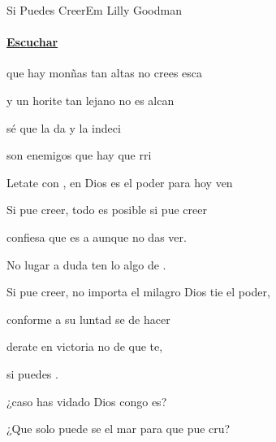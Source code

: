 \documentclass[12pt, spanish]{book}
\newcommand{\NotCCLIed}{\relax}
\begin{document}
    \begin{song}{Si Puedes Creer}{Em}
    {} %
    {Lilly Goodman}
    {} %
    {} %
        \ifChordBk
         \paragraph{\mbox{}\hfill\protect\href{https://open.spotify.com/intl-es/track/03zBrLi4BWMlf09IoK9TIJ}{Escuchar}\mbox{}\hfill}
        \fi


        \begin{SBOpGroup}
             que hay monñas tan altas  no crees esca

            y un horite tan lejano  no es alcan

            sé que la da y la indeci

            son enemigos que hay que rri

            Letate con , en Dios es el poder para hoy ven
        \end{SBOpGroup}

        \begin{SBChorus}
            Si pue creer, todo es posible si pue creer

            confiesa que es a aunque no das ver.

            No  lugar a duda ten lo algo de .

            Si pue creer, no importa el milagro Dios tie el poder,

            conforme a su luntad se  de hacer

            derate en victoria no  de que te,

            si puedes .
        \end{SBChorus}

        \begin{SBOpGroup}
            ¿caso has vidado  Dios congo es?

            ¿Que solo  puede se el mar para que pue cru?


\end{SBOpGroup}
\end{song}
\end{document}
